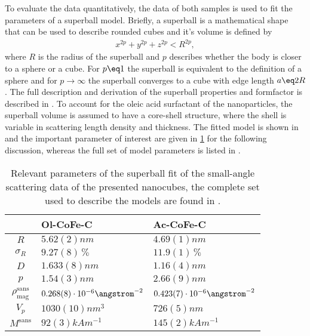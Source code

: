 \documentclass[\main/dresen_thesis.tex]{subfiles}
\begin{document}
    To evaluate the data quantitatively, the data of both samples is used to fit the parameters of a superball model.
    Briefly, a superball is a mathematical shape that can be used to describe rounded cubes and it's volume is defined by
    \begin{align}
      x^{2p} + y^{2p} + z^{2p} < R^{2p},
    \end{align}
    where $R$ is the radius of the superball and $p$ describes whether the body is closer to a sphere or a cube.
    For $p\eq 1$ the superball is equivalent to the definition of a sphere and for $p \rightarrow \infty$ the superball converges to a cube with edge length $a \eq 2R$.
    The full description and derivation of the superball properties and formfactor is described in .
    To account for the oleic acid surfactant of the nanoparticles, the superball volume is assumed to have a core-shell structure, where the shell is variable in scattering length density and thickness.
    The fitted model is shown in  and the important parameter of interest are given in \ref{tab:monolayers:nanoparticle:sas} for the following discussion, whereas the full set of model parameters is listed in .
    \begin{table}[ht]
      \centering
      \caption{\label{tab:monolayers:nanoparticle:sas}Relevant parameters of the superball fit of the small-angle scattering data of the presented nanocubes, the complete set used to describe the models are found in .}
      \begin{tabular}{ c | l | l }
          & Ol-CoFe-C & Ac-CoFe-C \\
        \hline
        $R$
          & $5.62(2) \unit{nm}$
          & $4.69(1) \unit{nm}$\\
        $\sigma_R$
          & $9.27(8) \,\%$
          & $11.9(1) \,\%$\\
        $D$
          & $1.633(8) \unit{nm}$
          & $1.16(4) \unit{nm}$\\
        $p$
          & $1.54(3) \unit{nm}$
          & $2.66(9) \unit{nm}$\\
        $\rho_\mathrm{mag}^\mathrm{sans}$
          & $0.268(8) \cdot 10^{-6} \angstrom^{-2}$
          & $0.423(7) \cdot 10^{-6} \angstrom^{-2}$\\
        \hline
        $V_p$
          & $1030(10) \unit{nm^3}$
          & $726(5) \unit{nm}$\\
        $M^\mathrm{sans}$
          & $92(3) \unit{kAm^{-1}}$
          & $145(2) \unit{kAm^{-1}}$\\
        \hline
      \end{tabular}
    \end{table}
\end{document}
